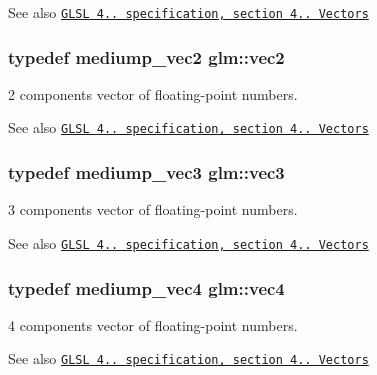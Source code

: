\begin{DoxySeeAlso}{See also}
\href{http://www.opengl.org/registry/doc/GLSLangSpec.4.20.8.pdf}{\tt G\+L\+S\+L 4.. specification, section 4.. Vectors} 
\end{DoxySeeAlso}
\hypertarget{group__core__types_ga66d091b759687504ab01365fbd33a1dd}{}
\subsubsection[{vec2}]{\setlength{\rightskip}{0pt plus 5cm}typedef mediump\+\_\+vec2 {\bf glm\+::vec2}}\label{group__core__types_ga66d091b759687504ab01365fbd33a1dd}
2 components vector of floating-\/point numbers.

\begin{DoxySeeAlso}{See also}
\href{http://www.opengl.org/registry/doc/GLSLangSpec.4.20.8.pdf}{\tt G\+L\+S\+L 4.. specification, section 4.. Vectors} 
\end{DoxySeeAlso}
\hypertarget{group__core__types_gad45787527c6ff2bd6680867204eb0354}{}
\subsubsection[{vec3}]{\setlength{\rightskip}{0pt plus 5cm}typedef mediump\+\_\+vec3 {\bf glm\+::vec3}}\label{group__core__types_gad45787527c6ff2bd6680867204eb0354}
3 components vector of floating-\/point numbers.

\begin{DoxySeeAlso}{See also}
\href{http://www.opengl.org/registry/doc/GLSLangSpec.4.20.8.pdf}{\tt G\+L\+S\+L 4.. specification, section 4.. Vectors} 
\end{DoxySeeAlso}
\hypertarget{group__core__types_gae9c89157f980f7247cdee8bf55787035}{}
\subsubsection[{vec4}]{\setlength{\rightskip}{0pt plus 5cm}typedef mediump\+\_\+vec4 {\bf glm\+::vec4}}\label{group__core__types_gae9c89157f980f7247cdee8bf55787035}
4 components vector of floating-\/point numbers.

\begin{DoxySeeAlso}{See also}
\href{http://www.opengl.org/registry/doc/GLSLangSpec.4.20.8.pdf}{\tt G\+L\+S\+L 4.. specification, section 4.. Vectors} 
\end{DoxySeeAlso}
